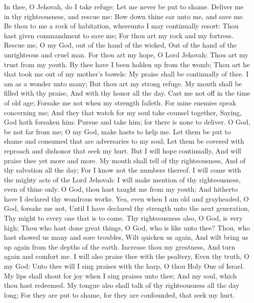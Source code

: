 In thee, O Jehovah, do I take refuge: Let me never be put to shame.  Deliver me in thy righteousness, and rescue me: Bow down thine ear unto me, and save me.  Be thou to me a rock of habitation, whereunto I may continually resort: Thou hast given commandment to save me; For thou art my rock and my fortress.  Rescue me, O my God, out of the hand of the wicked, Out of the hand of the unrighteous and cruel man.  For thou art my hope, O Lord Jehovah: Thou art my trust from my youth.  By thee have I been holden up from the womb; Thou art he that took me out of my mother’s bowels: My praise shall be continually of thee.  I am as a wonder unto many; But thou art my strong refuge.  My mouth shall be filled with thy praise, And with thy honor all the day.  Cast me not off in the time of old age; Forsake me not when my strength faileth.  For mine enemies speak concerning me; And they that watch for my soul take counsel together,  Saying, God hath forsaken him: Pursue and take him; for there is none to deliver.  O God, be not far from me; O my God, make haste to help me.  Let them be put to shame and consumed that are adversaries to my soul; Let them be covered with reproach and dishonor that seek my hurt.  But I will hope continually, And will praise thee yet more and more.  My mouth shall tell of thy righteousness, And of thy salvation all the day; For I know not the numbers thereof.  I will come with the mighty acts of the Lord Jehovah: I will make mention of thy righteousness, even of thine only.  O God, thou hast taught me from my youth; And hitherto have I declared thy wondrous works.  Yea, even when I am old and grayheaded, O God, forsake me not, Until I have declared thy strength unto the next generation, Thy might to every one that is to come.  Thy righteousness also, O God, is very high; Thou who hast done great things, O God, who is like unto thee?  Thou, who hast showed us many and sore troubles, Wilt quicken us again, And wilt bring us up again from the depths of the earth.  Increase thou my greatness, And turn again and comfort me.  I will also praise thee with the psaltery, Even thy truth, O my God: Unto thee will I sing praises with the harp, O thou Holy One of Israel.  My lips shall shout for joy when I sing praises unto thee; And my soul, which thou hast redeemed.  My tongue also shall talk of thy righteousness all the day long; For they are put to shame, for they are confounded, that seek my hurt. 

